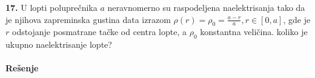 \textbf{\Large 17.} U lopti polupre\v{c}nika $a$ neravnomerno su raspodeljena naelektrisanja tako da je njihova zapreminska gustina data izrazom $\rho(r) = \rho_0 = \frac{a - r}{a}, r\in[0, a]$, gde je $r$ odstojanje posmatrane ta\v{c}ke od centra lopte, a $\rho_0$ konstantna veli\v{c}ina. koliko je ukupno naelektrisanje lopte?
\\\\
\textbf{\Large Re\v{s}enje}
